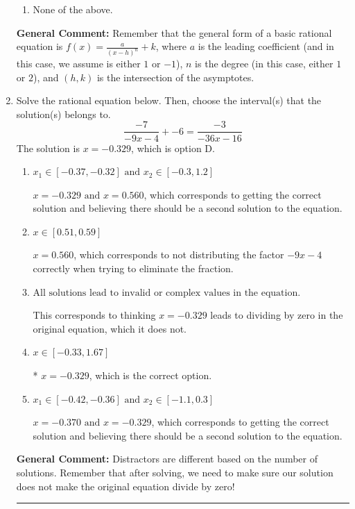 \documentclass{extbook}[14pt]
\newcommand{\litem}[1]{\item #1

\rule{\textwidth}{0.4pt}}
\begin{document}
\begin{enumerate}
{\begin{enumerate}[label=\Alph*.]
\item None of the above.\end{enumerate}
\textbf{General Comment:} Remember that the general form of a basic rational equation is $ f(x) = \frac{a}{(x-h)^n} + k$, where $a$ is the leading coefficient (and in this case, we assume is either $1$ or $-1$), $n$ is the degree (in this case, either $1$ or $2$), and $(h, k)$ is the intersection of the asymptotes.
}
\litem{
Solve the rational equation below. Then, choose the interval(s) that the solution(s) belongs to.
\[ \frac{-7}{-9x -4} + -6 = \frac{-3}{-36x -16} \]The solution is \( x = -0.329 \), which is option D.\begin{enumerate}[label=\Alph*.]
\item \( x_1 \in [-0.37, -0.32] \text{ and } x_2 \in [-0.3,1.2] \)

$x = -0.329 \text{ and } x = 0.560$, which corresponds to getting the correct solution and believing there should be a second solution to the equation.
\item \( x \in [0.51,0.59] \)

$x = 0.560$, which corresponds to not distributing the factor $-9x -4$ correctly when trying to eliminate the fraction.
\item \( \text{All solutions lead to invalid or complex values in the equation.} \)

This corresponds to thinking $x = -0.329$ leads to dividing by zero in the original equation, which it does not.
\item \( x \in [-0.33,1.67] \)

* $x = -0.329$, which is the correct option.
\item \( x_1 \in [-0.42, -0.36] \text{ and } x_2 \in [-1.1,0.3] \)

$x = -0.370 \text{ and } x = -0.329$, which corresponds to getting the correct solution and believing there should be a second solution to the equation.
\end{enumerate}

\textbf{General Comment:} Distractors are different based on the number of solutions. Remember that after solving, we need to make sure our solution does not make the original equation divide by zero!
}
\end{enumerate}
\end{document}
